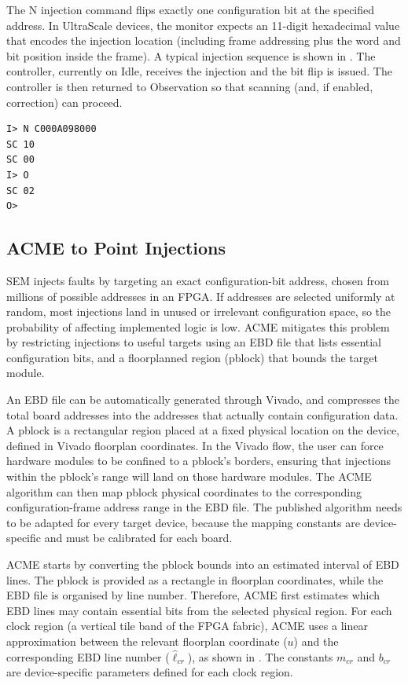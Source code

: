 The N injection command flips exactly one configuration bit at the specified address. In UltraScale devices, the monitor expects an 11-digit hexadecimal value that encodes the injection location (including frame addressing plus the word and bit position inside the frame).
A typical injection sequence is shown in . The controller, currently on Idle, receives the injection and the bit flip is issued. The controller is then returned to Observation so that scanning (and, if enabled, correction) can proceed.

\begin{lstlisting}[float=h,caption={Typical \ac{SEM} monitor flow for one configuration injection (UltraScale format shown).},label={lst:sem_injection_flow}]
I> N C000A098000
SC 10
SC 00
I> O
SC 02
O>
\end{lstlisting}


\subsection{ACME to Point Injections}
\label{chap8:fi_acme_theory}

\ac{SEM} injects faults by targeting an exact configuration-bit address, chosen from millions of possible addresses in an \ac{FPGA}. If addresses are selected uniformly at random, most injections land in unused or irrelevant configuration space, so the probability of affecting implemented logic is low. \ac{ACME} mitigates this problem by restricting injections to useful targets using an \ac{EBD} file that lists essential configuration bits, and a floorplanned region (pblock) that bounds the target module.

An \ac{EBD} file can be automatically generated through Vivado, and compresses the total board addresses into the addresses that actually contain configuration data. A pblock is a rectangular region placed at a fixed physical location on the device, defined in Vivado floorplan coordinates. In the Vivado flow, the user can force hardware modules to be confined to a pblock's borders, ensuring that injections within the pblock's range will land on those hardware modules.
The \ac{ACME} algorithm can then map pblock physical coordinates to the corresponding configuration-frame address range in the \ac{EBD} file. The published algorithm needs to be adapted for every target device, because the mapping constants are device-specific and must be calibrated for each board.


\ac{ACME} starts by converting the pblock bounds into an estimated interval of \ac{EBD} lines. The pblock is provided as a rectangle in floorplan coordinates, while the \ac{EBD} file is organised by line number. Therefore, \ac{ACME} first estimates which \ac{EBD} lines may contain essential bits from the selected physical region. For each clock region (a vertical tile band of the \ac{FPGA} fabric), \ac{ACME} uses a linear approximation between the relevant floorplan coordinate ($u$) and the corresponding \ac{EBD} line number ($\widehat{\ell}_{cr}$), as shown in . The constants $m_{cr}$ and $b_{cr}$ are device-specific parameters defined for each clock region.

